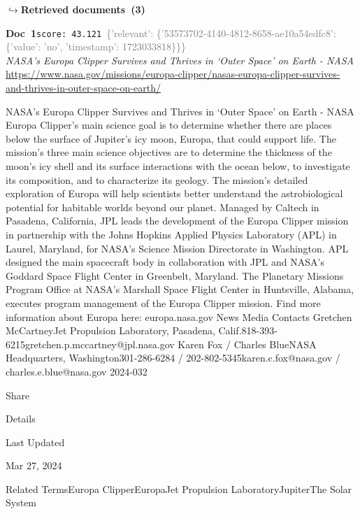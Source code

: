 \documentclass[a4paper,11pt]{article}
\begin{document}
\noindent\hfill{\footnotesize\textcolor{doccolor}{\textbf{$\hookrightarrow$\enspace Retrieved documents~(3)}}}
\begin{docenv}
{\footnotesize\textcolor{doccolor}{\textbf{Doc~1}}}\hfill{\tiny\texttt{score:~43.121}}\ {\tiny\textcolor{gray}{\{'relevant': \{'53573702-4140-4812-8658-ae10a54edfc8': \{'value': 'no', 'timestamp': 1723033818\}\}\}}}\\[3pt]
{\small\textit{NASA’s Europa Clipper Survives and Thrives in ‘Outer Space’ on Earth - NASA}}\\[2pt]
{\tiny\url{https://www.nasa.gov/missions/europa-clipper/nasas-europa-clipper-survives-and-thrives-in-outer-space-on-earth/}}\\[4pt]
{\footnotesize NASA’s Europa Clipper Survives and Thrives in ‘Outer Space’ on Earth - NASA
Europa Clipper’s main science goal is to determine whether there are places below the surface of Jupiter’s icy moon, Europa, that could support life. The mission’s three main science objectives are to determine the thickness of the moon’s icy shell and its surface interactions with the ocean below, to investigate its composition, and to characterize its geology. The mission’s detailed exploration of Europa will help scientists better understand the astrobiological potential for habitable worlds beyond our planet.
Managed by Caltech in Pasadena, California, JPL leads the development of the Europa Clipper mission in partnership with the Johns Hopkins Applied Physics Laboratory (APL) in Laurel, Maryland, for NASA’s Science Mission Directorate in Washington. APL designed the main spacecraft body in collaboration with JPL and NASA’s Goddard Space Flight Center in Greenbelt, Maryland. The Planetary Missions Program Office at NASA’s Marshall Space Flight Center in Huntsville, Alabama, executes program management of the Europa Clipper mission.
Find more information about Europa here:
europa.nasa.gov
News Media Contacts
Gretchen McCartneyJet Propulsion Laboratory, Pasadena, Calif.818-393-6215gretchen.p.mccartney@jpl.nasa.gov
Karen Fox / Charles BlueNASA Headquarters, Washington301-286-6284 / 202-802-5345karen.c.fox@nasa.gov / charles.e.blue@nasa.gov
2024-032

Share

Details

Last Updated

Mar 27, 2024

Related TermsEuropa ClipperEuropaJet Propulsion LaboratoryJupiterThe Solar System

 

}
\end{docenv}
\end{document}
